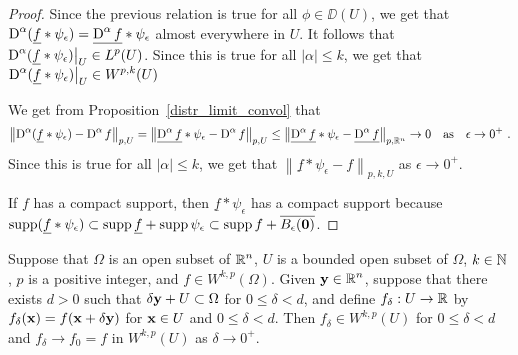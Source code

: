 \begin{proof}
Since the previous relation is true for all $\phi \in \DD(U)$, we get that
$\displaystyle \operatorname{D}^\alpha(\underline{f} \ast \psi_\epsilon)
= \underline{\operatorname{D}^\alpha f} \ast \psi_\epsilon$ almost everywhere in
$U$.  It follows that
$\displaystyle \operatorname{D}^\alpha(\underline{f} \ast \psi_\epsilon)\big|_U \in L^p(U)$.
Since this is true for all $|\alpha|\leq k$, we get that
$\displaystyle \operatorname{D}^\alpha(\underline{f} \ast \psi_\epsilon)\big|_U
\in W^{p,k}(U)$

We get from Proposition~\ref{distr_limit_convol} that
\[
\left\| \operatorname{D}^\alpha(\underline{f} \ast \psi_\epsilon)
- \operatorname{D}^\alpha f \right\|_{p,U}
= \left\| \underline{\operatorname{D}^\alpha f} \ast \psi_\epsilon
- \operatorname{D}^\alpha f \right\|_{p,U}
\leq \left\| \underline{\operatorname{D}^\alpha f} \ast \psi_\epsilon -
\underline{\operatorname{D}^\alpha f} \right\|_{p,\mathbb{R}^n} \to 0 \quad \text{as} \quad
\epsilon \to 0^+ \ .
\]
Since this is true for all $|\alpha| \leq k$, we get that
$\displaystyle \left\| \underline{f} \ast \psi_\epsilon - f \right\|_{p,k,U}$
as $\epsilon \to 0^+$.

If $f$ has a compact support, then
$\displaystyle \underline{f} \ast \psi_\epsilon$ has a compact support
because
$\displaystyle \operatorname{supp} (\underline{f} \ast \psi_\epsilon)
\subset \operatorname{supp} \underline{f} + \operatorname{supp} \psi_\epsilon
\subset \operatorname{supp} f + \overline{B_\epsilon(\mathbf{0})}$.
\end{proof}

\begin{lemma} \label{sob_denselem3}
Suppose that $\Omega$ is an open subset of $\displaystyle \mathbb{R}^n$,
$U$ is a bounded open subset of $\Omega$,
$k\in \mathbb{N}$, $p$ is a positive integer, and
$\displaystyle f \in W^{k,p}(\Omega)$.
Given $\displaystyle \mathbf{y} \in \mathbb{R}^n$, suppose that there exists
$d>0$ such that $\delta \mathbf{y} + U \subset \Omega$ for
$0 \leq \delta < d$, and
define $f_\delta:U \to \mathbb{R}$ by $f_\delta(\mathbf{x}) = f(\mathbf{x} + \delta \mathbf{y})$
for $\mathbf{x} \in U$ and $0 \leq \delta < d$.  Then
$\displaystyle f_\delta \in W^{k,p}(U)$ for $0 \leq \delta < d$ and
$f_\delta \to f_0 = f$ in $\displaystyle W^{k,p}(U)$ as $\delta \to 0^+$.
\end{lemma}

